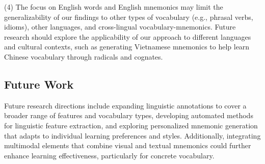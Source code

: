 (4) The focus on English words and English mnemonics may limit the generalizability of our findings to other types of vocabulary (e.g., phrasal verbs, idioms), other languages, and cross-lingual vocabulary-mnemonics. Future research should explore the applicability of our approach to different languages and cultural contexts, such as generating Vietnamese mnemonics to help learn Chinese vocabulary through radicals and cognates.

\subsection{Future Work} \label{sec:future-work}
Future research directions include expanding linguistic annotations to cover a broader range of features and vocabulary types, developing automated methods for linguistic feature extraction, and exploring personalized mnemonic generation that adapts to individual learning preferences and styles. Additionally, integrating multimodal elements that combine visual and textual mnemonics could further enhance learning effectiveness, particularly for concrete vocabulary.
